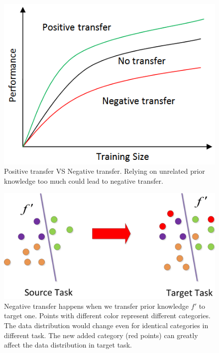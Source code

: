 \begin{figure}
\centering
\includegraphics[scale=.5]{fig/negative.png}
\caption{Positive transfer VS Negative transfer. Relying on unrelated prior knowledge too much could lead to negative transfer.}\label{fig:neg}
\end{figure}
\begin{figure}
\centering
\includegraphics[scale=.4]{fig/domain.jpg}
\caption{Negative transfer happens when we transfer prior knowledge $f'$ to target one. Points with different color represent different categories. The data distribution would change even for identical categories in different task. The new added category (red points) can greatly affect the data distribution in target task. }\label{fig:distribution}
\end{figure}

